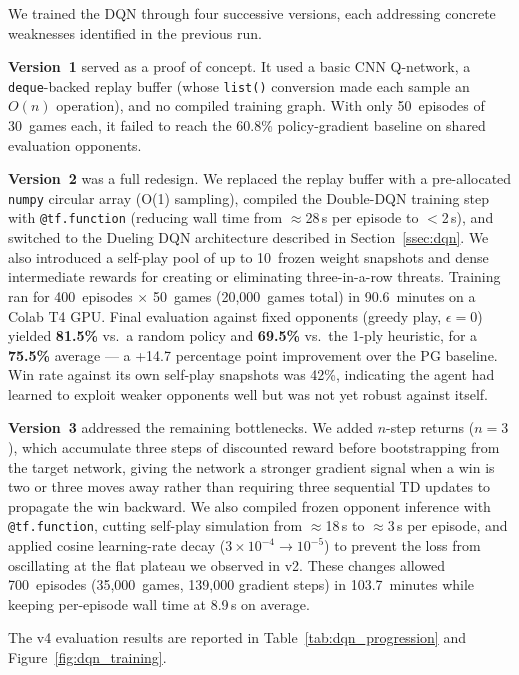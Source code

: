 \documentclass[11pt]{article}
\begin{document}
We trained the DQN through four successive versions, each addressing
concrete weaknesses identified in the previous run.

\textbf{Version~1} served as a proof of concept. It used a basic CNN
Q-network, a \texttt{deque}-backed replay buffer (whose \texttt{list()}
conversion made each sample an $O(n)$ operation), and no compiled
training graph. With only 50~episodes of 30~games each, it failed to
reach the 60.8\% policy-gradient baseline on shared evaluation
opponents.

\textbf{Version~2} was a full redesign. We replaced the replay buffer
with a pre-allocated \texttt{numpy} circular array (O(1) sampling),
compiled the Double-DQN training step with \texttt{@tf.function}
(reducing wall time from $\approx$28\,s per episode to $<$2\,s), and
switched to the Dueling DQN architecture described in
Section~\ref{ssec:dqn}. We also introduced a self-play pool of up to
10~frozen weight snapshots and dense intermediate rewards for creating
or eliminating three-in-a-row threats. Training ran for
400~episodes $\times$ 50~games (20{,}000~games total) in 90.6~minutes
on a Colab T4 GPU. Final evaluation against fixed opponents (greedy
play, $\epsilon=0$) yielded \textbf{81.5\%} vs.\ a random policy and
\textbf{69.5\%} vs.\ the 1-ply heuristic, for a \textbf{75.5\%}
average --- a +14.7 percentage point improvement over the PG baseline.
Win rate against its own self-play snapshots was 42\%, indicating the
agent had learned to exploit weaker opponents well but was not yet
robust against itself.

\textbf{Version~3} addressed the remaining bottlenecks. We added
$n$-step returns ($n=3$), which accumulate three steps of discounted
reward before bootstrapping from the target network, giving the network
a stronger gradient signal when a win is two or three moves away rather
than requiring three sequential TD updates to propagate the win
backward. We also compiled frozen opponent inference with
\texttt{@tf.function}, cutting self-play simulation from $\approx$18\,s
to $\approx$3\,s per episode, and applied cosine learning-rate decay
($3\times10^{-4}\to10^{-5}$) to prevent the loss from oscillating at
the flat plateau we observed in v2. These changes allowed 700~episodes
(35{,}000~games, 139{,}000 gradient steps) in 103.7~minutes while
keeping per-episode wall time at 8.9\,s on average.

The v4 evaluation results are reported in Table~\ref{tab:dqn_progression}
and Figure~\ref{fig:dqn_training}.
\end{document}
